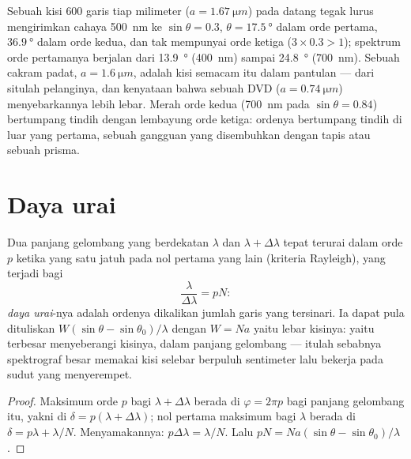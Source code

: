 \begin{example}\label{ex:b2:gratings:examples}
Sebuah kisi $600$ garis tiap milimeter ($a = \qty{1.67}{\micro m}$) pada datang
tegak lurus mengirimkan cahaya \qty{500}{nm} ke $\sin\theta = 0.3$, $\theta = \qty{17.5}{\degree}$ dalam
orde pertama, $\qty{36.9}{\degree}$ dalam orde kedua, dan tak mempunyai orde ketiga
($3 \times 0.3 > 1$); spektrum orde pertamanya berjalan dari \qty{13.9}{\degree}
(\qty{400}{nm}) sampai \qty{24.8}{\degree} (\qty{700}{nm}). Sebuah cakram padat, $a =
\qty{1.6}{\micro m}$, adalah kisi semacam itu dalam pantulan --- dari situlah pelanginya,
dan kenyataan bahwa sebuah DVD ($a = \qty{0.74}{\micro m}$) menyebarkannya lebih lebar.
Merah orde kedua (\qty{700}{nm} pada $\sin\theta = 0.84$) bertumpang tindih dengan lembayung
orde ketiga: ordenya bertumpang tindih di luar yang pertama, sebuah gangguan yang disembuhkan dengan tapis
atau sebuah prisma.
\end{example}

\section{Daya urai}

\begin{proposition}\label{prop:b2:gratings:resolution}
Dua panjang gelombang yang berdekatan $\lambda$ dan $\lambda + \Delta\lambda$ tepat terurai dalam orde $p$
ketika  yang satu jatuh pada nol pertama yang lain
(kriteria Rayleigh), yang terjadi bagi
\[
\frac\lambda{\Delta\lambda} = pN :
\]
\emph{daya urai}-nya adalah ordenya dikalikan jumlah garis yang
tersinari. Ia dapat pula dituliskan $W(\sin\theta - \sin\theta_0)/\lambda$ dengan $W = Na$ yaitu
lebar kisinya: yaitu  terbesar menyeberangi kisinya,
dalam panjang gelombang --- itulah sebabnya spektrograf besar memakai kisi selebar berpuluh
sentimeter lalu bekerja pada sudut yang menyerempet.
\end{proposition}

\begin{proof}
Maksimum orde $p$ bagi $\lambda + \Delta\lambda$ berada di $\varphi = 2\pi p$ bagi panjang
gelombang itu, yakni di $\delta = p(\lambda + \Delta\lambda)$; nol pertama maksimum
bagi $\lambda$ berada di $\delta = p\lambda + \lambda/N$. Menyamakannya: $p\Delta\lambda = \lambda/N$. Lalu $pN =
Na(\sin\theta - \sin\theta_0)/\lambda$.
\end{proof}

